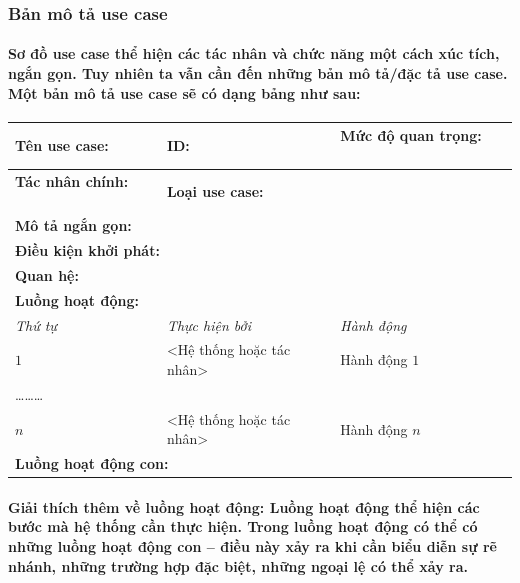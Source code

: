 \documentclass{article}
\begin{document}
    \subsubsection{Bản mô tả use case}
      \paragraph{\textnormal{
        Sơ đồ use case thể hiện các tác nhân và chức năng một cách xúc tích, ngắn gọn. Tuy nhiên ta vẫn cần đến những bản mô tả/đặc tả use case. Một bản mô tả use case sẽ có dạng bảng như sau:
      }}

      \begin{center}
        \begin{tabular}{|l|l|l|}
          \hline
          \textbf{Tên use case:} $ \qquad $ & \textbf{ID:} $ \qquad $ & \textbf{Mức độ quan trọng:} $ \qquad $ \\
          \hline
          \textbf{Tác nhân chính:} $ \qquad $ & \multicolumn{2}{|l|}{\textbf{Loại use case:} $ \qquad $} \\
          \hline
          \multicolumn{3}{|l|}{\textbf{Mô tả ngắn gọn:} $ \qquad $} \\
          \hline
          \multicolumn{3}{|l|}{\textbf{Điều kiện khởi phát:} $ \qquad $} \\
          \hline
          \multicolumn{3}{|l|}{\textbf{Quan hệ:} $ \qquad $} \\
          \hline
          \multicolumn{3}{|l|}{\textbf{Luồng hoạt động:} $ \qquad $} \\
          \hline
          \textit{Thứ tự} & \textit{Thực hiện bởi} & \textit{Hành động} \\
          \hline
          $1$ & <Hệ thống hoặc tác nhân> & Hành động $1$\\
          \hline
          \multicolumn{3}{|l|}{\ldots\ldots\ldots}\\
          \hline
          $n$ & <Hệ thống hoặc tác nhân> & Hành động $n$ \\
          \hline
          \multicolumn{3}{|l|}{\textbf{Luồng hoạt động con:} $ \qquad $} \\
          \hline
        \end{tabular}
      \end{center}
      \paragraph{\textnormal{
        Giải thích thêm về luồng hoạt động: Luồng hoạt động thể hiện các bước mà hệ thống cần thực hiện. Trong luồng hoạt động có thể có những luồng hoạt động con -- điều này xảy ra khi cần biểu diễn sự rẽ nhánh, những trường hợp đặc biệt, những ngoại lệ có thể xảy ra.
      }}
    
\end{document}
